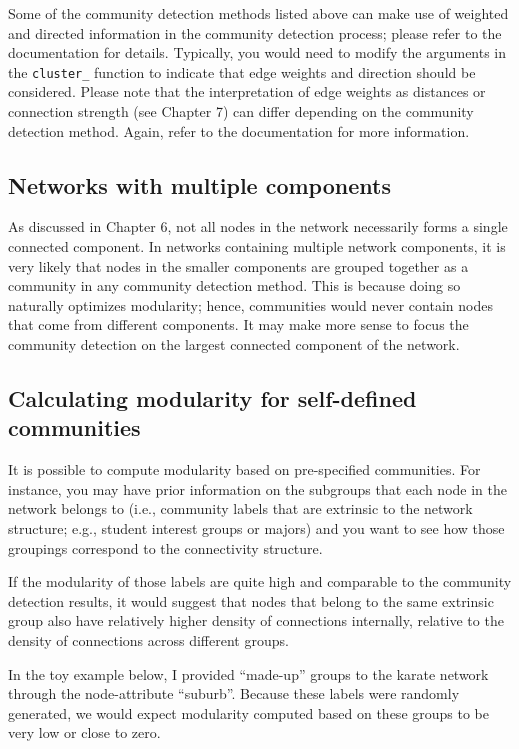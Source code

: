 \documentclass[
]{book}
\begin{document}
Some of the community detection methods listed above can make use of weighted and directed information in the community detection process; please refer to the documentation for details. Typically, you would need to modify the arguments in the \texttt{cluster\_} function to indicate that edge weights and direction should be considered. Please note that the interpretation of edge weights as distances or connection strength (see Chapter 7) can differ depending on the community detection method. Again, refer to the documentation for more information.

\subsection{Networks with multiple components}\label{networks-with-multiple-components}

As discussed in Chapter 6, not all nodes in the network necessarily forms a single connected component. In networks containing multiple network components, it is very likely that nodes in the smaller components are grouped together as a community in any community detection method. This is because doing so naturally optimizes modularity; hence, communities would never contain nodes that come from different components. It may make more sense to focus the community detection on the largest connected component of the network.

\subsection{Calculating modularity for self-defined communities}\label{calculating-modularity-for-self-defined-communities}

It is possible to compute modularity based on pre-specified communities. For instance, you may have prior information on the subgroups that each node in the network belongs to (i.e., community labels that are extrinsic to the network structure; e.g., student interest groups or majors) and you want to see how those groupings correspond to the connectivity structure.

If the modularity of those labels are quite high and comparable to the community detection results, it would suggest that nodes that belong to the same extrinsic group also have relatively higher density of connections internally, relative to the density of connections across different groups.

In the toy example below, I provided ``made-up'' groups to the karate network through the node-attribute ``suburb''. Because these labels were randomly generated, we would expect modularity computed based on these groups to be very low or close to zero.
\end{document}
